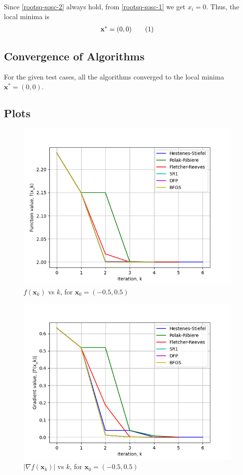 \documentclass[a4paper]{article}
\newcommand\numberthis{\addtocounter{equation}{1}\tag{\theequation}}
\begin{document}
Since \eqref{rootsq-sosc-2} always hold, from \eqref{rootsq-sosc-1} we get $x_i = 0$. Thus, the local minima is
\begin{align*}
\textbf{x}^* = (0, 0) \numberthis \label{rootsq-minima}
\end{align*}

\subsection{Convergence of Algorithms}

For the given test cases, all the algorithms converged to the local minima $\textbf{x}^* = (0, 0)$.

\subsection{Plots}

\begin{figure}[H]
    \centering
    \includegraphics[width=.65\textwidth]{func_1_vals.png}
    \caption{$f(\textbf{x}_k)$ vs $k$, for $\textbf{x}_0 = (-0.5, 0.5)$}
\end{figure}

\begin{figure}[H]
    \centering
    \includegraphics[width=.65\textwidth]{func_1_grad.png}
    \caption{$|\nabla f(\textbf{x}_k)|$ vs $k$, for $\textbf{x}_0 = (-0.5, 0.5)$}
\end{figure}
\end{document}
